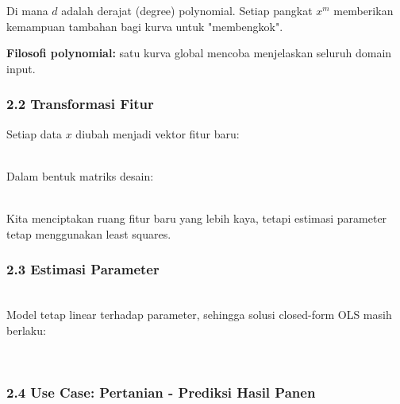 \documentclass[12pt,a4paper]{article}
\begin{document}
Di mana $d$ adalah derajat (degree) polynomial. Setiap pangkat $x^m$ memberikan kemampuan tambahan bagi kurva untuk "membengkok".


\textbf{Filosofi polynomial:} satu kurva global mencoba menjelaskan seluruh domain input.


\subsubsection{2.2 Transformasi Fitur}

Setiap data $x$ diubah menjadi vektor fitur baru:


\\[
x \rightarrow (x, x^2, x^3, x^4, x^5)
\\]


Dalam bentuk matriks desain:


\\[
X_{\text{poly}} =

\begin{bmatrix}

x_1 & x_1^2 & x_1^3 & x_1^4 & x_1^5 \\

x_2 & x_2^2 & x_2^3 & x_2^4 & x_2^5 \\

\vdots & \vdots & \vdots & \vdots & \vdots \\

x_n & x_n^2 & x_n^3 & x_n^4 & x_n^5

\end{bmatrix}
\\]


Kita menciptakan ruang fitur baru yang lebih kaya, tetapi estimasi parameter tetap menggunakan least squares.


\subsubsection{2.3 Estimasi Parameter}

\\[
\min_{\beta} \sum_{i=1}^{n} (y_i - \hat{y}(x_i))^2
\\]


Model tetap linear terhadap parameter, sehingga solusi closed-form OLS masih berlaku:


\\[
\hat{\beta} = (X_{\text{poly}}^T X_{\text{poly}})^{-1} X_{\text{poly}}^T y
\\]


\subsubsection{2.4 Use Case: Pertanian - Prediksi Hasil Panen}
\end{document}
